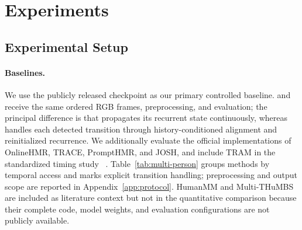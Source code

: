 \FloatBarrier
\section{Experiments}
\label{sec:experiments}



\subsection{Experimental Setup}

\paragraph{Baselines.}
We use the publicly released \humanthree{} checkpoint as our primary
controlled baseline. \humanthree{} and \method{} receive the same ordered RGB
frames, preprocessing, and evaluation; the principal difference is that
\humanthree{} propagates its recurrent state continuously, whereas \method{}
handles each detected transition through history-conditioned alignment and
reinitialized recurrence. We additionally evaluate the official
implementations of OnlineHMR, TRACE, PromptHMR, and JOSH, and include TRAM in
the standardized timing study
~\citep{zhao2026onlinehmr,sun2023trace,wang2025prompthmr,liu2026josh,wang2024tram}.
Table~\ref{tab:multi-person} groups methods by temporal access and marks
explicit transition handling; preprocessing and output scope are reported in
Appendix~\ref{app:protocol}. HumanMM and Multi-THuMBS are included as
literature context but not in the quantitative comparison because their
complete code, model weights, and evaluation configurations are not publicly
available.

